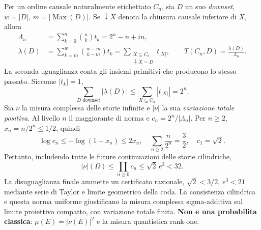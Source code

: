 \documentclass[11pt,a4paper]{article}
\begin{document}
Per un ordine causale naturalmente etichettato $C_n$, sia $D$ un suo \emph{downset}, $w=|D|$, $m=|\operatorname{Max}(D)|$. Se $\downarrow X$ denota la chiusura causale inferiore di $X$, allora
\begin{equation}
\begin{split}
\Lambda_n&=\sum_{k=0}^n\binom nk t_k=2^n-n+in,\\
\lambda(D)&=\sum_{k=m}^{w}\binom{w-m}{k-m}t_k
 =\sum_{\substack{X\subseteq C_n\\\downarrow X=D}}t_{|X|},\qquad
T(C_n,D)=\frac{\lambda(D)}{\Lambda_n}.
\end{split}\tag{RG.1}
\end{equation}
La seconda uguaglianza conta gli insiemi primitivi che producono lo stesso passato. Siccome $|t_k|=1$,
\begin{equation}
\sum_{D\text{ downset}}|\lambda(D)|\le
\sum_{X\subseteq C_n}|t_{|X|}|=2^n.
\tag{RG.2}
\end{equation}
Sia $\nu$ la misura complessa delle storie infinite e $|\nu|$ la sua \emph{variazione totale positiva}. Al livello $n$ il maggiorante di norma e $c_n=2^n/|\Lambda_n|$. Per $n\ge2$, $x_n=n/2^n\le1/2$, quindi
\begin{equation}
\log c_n\le-\log(1-x_n)\le 2x_n,\quad
\sum_{n\ge2}\frac n{2^n}=\frac32,\quad c_1=\sqrt2.
\tag{RG.3}
\end{equation}
Pertanto, includendo tutte le future continuazioni delle storie cilindriche,
\begin{equation}
\boxed{\ |\nu|(\Omega)\le \prod_{n\ge0}c_n\le \sqrt2\,e^3<32.\ }
\tag{RG.4}
\end{equation}
La disuguaglianza finale ammette un certificato razionale, $\sqrt2<3/2$, $e^3<21$ mediante serie di Taylor e limite geometrico della coda. La consistenza cilindrica e questa norma uniforme giustificano la misura complessa sigma-additiva sul limite proiettivo compatto, con variazione totale finita. \textbf{Non e una probabilita classica}: $\mu(E)=|\nu(E)|^2$ e la misura quantistica rank-one.

\clearpage
\end{document}
